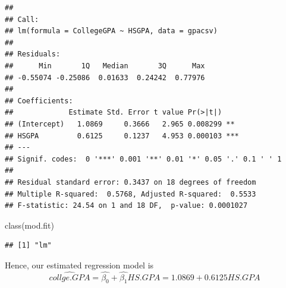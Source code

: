 \documentclass[
]{book}
\newenvironment{Shaded}{\begin{snugshade}}{\end{snugshade}}
\newcommand{\FunctionTok}[1]{\textcolor[rgb]{0.00,0.00,0.00}{#1}}
\newcommand{\NormalTok}[1]{#1}
\theoremstyle{definition}
\theoremstyle{definition}
\theoremstyle{definition}
\theoremstyle{definition}
\theoremstyle{remark}
\begin{document}
\begin{verbatim}
## 
## Call:
## lm(formula = CollegeGPA ~ HSGPA, data = gpacsv)
## 
## Residuals:
##      Min       1Q   Median       3Q      Max 
## -0.55074 -0.25086  0.01633  0.24242  0.77976 
## 
## Coefficients:
##             Estimate Std. Error t value Pr(>|t|)    
## (Intercept)   1.0869     0.3666   2.965 0.008299 ** 
## HSGPA         0.6125     0.1237   4.953 0.000103 ***
## ---
## Signif. codes:  0 '***' 0.001 '**' 0.01 '*' 0.05 '.' 0.1 ' ' 1
## 
## Residual standard error: 0.3437 on 18 degrees of freedom
## Multiple R-squared:  0.5768, Adjusted R-squared:  0.5533 
## F-statistic: 24.54 on 1 and 18 DF,  p-value: 0.0001027
\end{verbatim}

\begin{Shaded}
\begin{Highlighting}[]
\FunctionTok{class}\NormalTok{(mod.fit)}
\end{Highlighting}
\end{Shaded}

\begin{verbatim}
## [1] "lm"
\end{verbatim}

Hence, our estimated regression model is\[ \hat{collge.GPA}=\hat{\beta_0}+\hat{\beta_1}HS.GPA
=1.0869+0.6125HS.GPA\]
\end{document}
